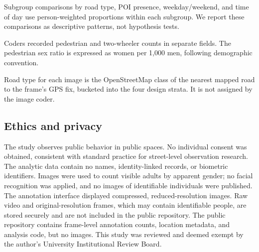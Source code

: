 \documentclass[12pt]{article}
\begin{document}
Subgroup comparisons by road type, POI presence, weekday/weekend, and time of day use person-weighted proportions within each subgroup. We report these comparisons as descriptive patterns, not hypothesis tests.

Coders recorded pedestrian and two-wheeler counts in separate fields. The pedestrian sex ratio is expressed as women per 1,000 men, following demographic convention.

Road type for each image is the OpenStreetMap class of the nearest mapped road to the frame's GPS fix, bucketed into the four design strata. It is not assigned by the image coder.

\subsection{Ethics and privacy}

The study observes public behavior in public spaces. No individual consent was obtained, consistent with standard practice for street-level observation research. The analytic data contain no names, identity-linked records, or biometric identifiers. Images were used to count visible adults by apparent gender; no facial recognition was applied, and no images of identifiable individuals were published. The annotation interface displayed compressed, reduced-resolution images. Raw video and original-resolution frames, which may contain identifiable people, are stored securely and are not included in the public repository. The public repository contains frame-level annotation counts, location metadata, and analysis code, but no images. This study was reviewed and deemed exempt by the author's University Institutional Review Board. %




\end{document}
